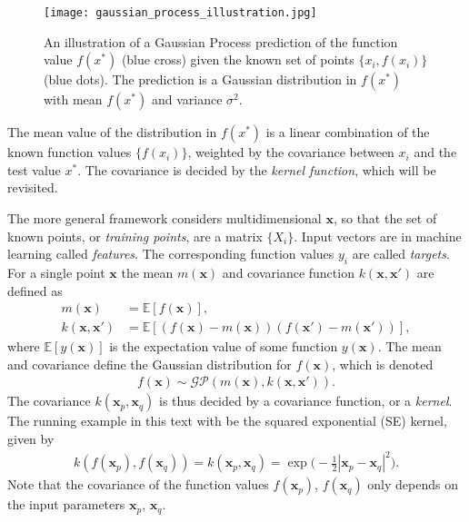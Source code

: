 \documentclass[twoside,english]{uiofysmaster}
\begin{document}
\begin{figure}
\centering
\texttt{[image: gaussian\_process\_illustration.jpg]}
\caption{An illustration of a Gaussian Process prediction of the function value $f(x^*)$ (blue cross) given the known set of points $\{x_i, f(x_i)\}$ (blue dots). The prediction is a Gaussian distribution in $f(x^*)$ with mean $f(x^*)$ and variance $\sigma^2$.}
\label{Fig:: gaussian process : GP illustration}
\end{figure}

The mean value of the distribution in $f(x^*)$ is a linear combination of the known function values $\{ f(x_i) \}$, weighted by the covariance between $x_i$ and the test value $x^*$. The covariance is decided by the \textit{kernel function}, which will be revisited. 

The more general framework considers multidimensional $\textbf{x}$, so that the set of known points, or \textit{training points}, are a matrix $\{X_i\}$. Input vectors are in machine learning called \textit{features}. The corresponding function values $y_i$ are called \textit{targets}. For a single point $\textbf{x}$ the mean  $m(\textbf{x})$ and covariance function $k(\textbf{x}, \textbf{x}')$ are defined as
\begin{align}
m(\textbf{x}) &= \mathbb{E}[f(\textbf{x})],\\
k(\textbf{x}, \textbf{x}') &= \mathbb{E} [(f(\textbf{x}) - m(\textbf{x}))(f(\textbf{x}') - m(\textbf{x}'))],
\end{align}
where $\mathbb{E}[y(\textbf{x})]$ is the expectation value of some function $y(\textbf{x})$. The mean and covariance define the Gaussian distribution for $f(\textbf{x})$, which is denoted 
\begin{align}
f(\textbf{x}) \sim \mathcal{GP}(m(\textbf{x}), k(\textbf{x}, \textbf{x}')).
\end{align}
The covariance $k(\textbf{x}_p, \textbf{x}_q)$ is thus decided by a covariance function, or a \textit{kernel}. The running example in this text with be the squared exponential (SE) kernel, given by
\begin{align}
k(f(\textbf{x}_p), f(\textbf{x}_q)) = k(\textbf{x}_p, \textbf{x}_q) = \exp \Big( - \frac{1}{2} |\textbf{x}_p - \textbf{x}_q|^2 \Big).
\end{align}
Note that the covariance of the function values $f(\textbf{x}_p)$, $f(\textbf{x}_q)$ only depends on the input parameters $\textbf{x}_p$, $\textbf{x}_q$. 
\end{document}

